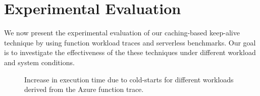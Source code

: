 \section{Experimental Evaluation}

\label{sec:eval}


We now present the experimental evaluation of our caching-based keep-alive technique by using function workload traces and serverless benchmarks.
Our goal is to investigate the effectiveness of the these techniques under different workload and system conditions. 


\begin{figure}
  \centering
{}
  \hfill 
\hfill 
\caption{Increase in execution time due to cold-starts for different workloads derived from the Azure function trace.}
\label{fig:exec-overheads-all}
\end{figure}


